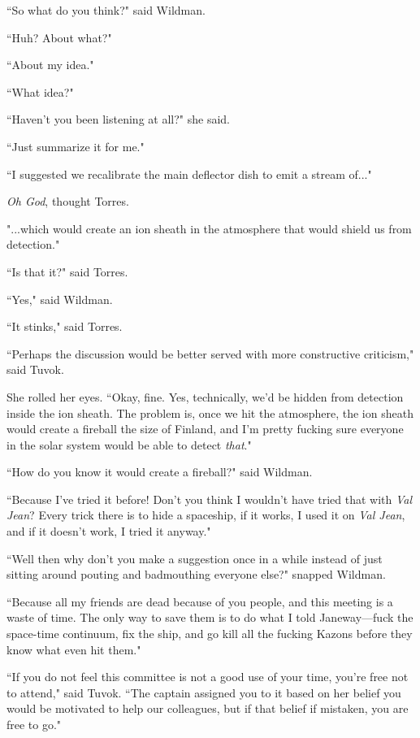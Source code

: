\documentclass[twoside,letterpaper,12pt]{memoir}
\begin{document}
``So what do you think?" said Wildman. 

``Huh? About what?" 

``About my idea." 

``What idea?" 

``Haven't you been listening at all?" she said. 

``Just summarize it for me." 

``I suggested we recalibrate the main deflector dish to emit a stream of..." 

\textit{Oh God}, thought Torres. 

"...which would create an ion sheath in the atmosphere that would shield us from detection." 

``Is that it?" said Torres. 

``Yes," said Wildman. 

``It stinks," said Torres. 

``Perhaps the discussion would be better served with more constructive criticism," said Tuvok. 

She rolled her eyes. ``Okay, fine. Yes, technically, we'd be hidden from detection inside the ion sheath. The problem is, once we hit the atmosphere, the ion sheath would create a fireball the size of Finland, and I'm pretty fucking sure everyone in the solar system would be able to detect \textit{that}." 

``How do you know it would create a fireball?" said Wildman. 

``Because I've tried it before! Don't you think I wouldn't have tried that with \textit{Val Jean}? Every trick there is to hide a spaceship, if it works, I used it on \textit{Val Jean}, and if it doesn’t work, I tried it anyway." 

``Well then why don't you make a suggestion once in a while instead of just sitting around pouting and badmouthing everyone else?" snapped Wildman. 

``Because all my friends are dead because of you people, and this meeting is a waste of time. The only way to save them is to do what I told Janeway---fuck the space-time continuum, fix the ship, and go kill all the fucking Kazons before they know what even hit them." 

``If you do not feel this committee is not a good use of your time, you're free not to attend," said Tuvok. ``The captain assigned you to it based on her belief you would be motivated to help our colleagues, but if that belief if mistaken, you are free to go." 
\end{document}
